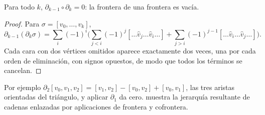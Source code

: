 \begin{theorem}[$\partial^2 = 0$]
\label{thm:gauge:partial-squared}
Para todo $k$, $\partial_{k-1}\circ\partial_k = 0$: la frontera de una frontera es
vac\'ia.
\end{theorem}

\begin{proof}
Para $\sigma = [v_0, \ldots, v_k]$,
\[
  \partial_{k-1}(\partial_k\sigma) = \sum_{i} (-1)^i \Big(\sum_{j<i}(-1)^j
  [\ldots \hat v_j \ldots \hat v_i \ldots] + \sum_{j>i}(-1)^{j-1}
  [\ldots \hat v_i \ldots \hat v_j \ldots]\Big).
\]
Cada cara con dos v\'ertices omitidos aparece exactamente dos veces, una por cada
orden de eliminaci\'on, con signos opuestos, de modo que todos los t\'erminos se
cancelan.
\end{proof}

Por ejemplo $\partial_2[v_0, v_1, v_2] = [v_1, v_2] - [v_0, v_2] + [v_0, v_1]$,
las tres aristas orientadas del tri\'angulo, y aplicar $\partial_1$ da cero.
 muestra la jerarqu\'ia resultante de cadenas
enlazadas por aplicaciones de frontera y cofrontera.

